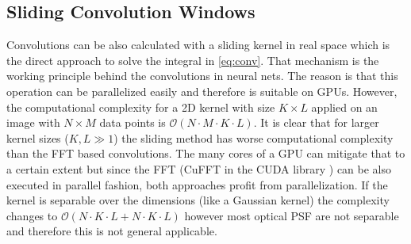 \documentclass{juliacon}
\begin{document}
\subsection{Sliding Convolution Windows}
Convolutions can be also calculated with a sliding kernel in real space which is the direct approach to
solve the integral in \autoref{eq:conv}.
That mechanism is the working principle
behind the convolutions in neural nets. The reason is that this operation can be parallelized easily and therefore 
is suitable on GPUs. However, the computational complexity for a 2D kernel with size $K \times L$ applied on an image with
$N \times M$ data points is $\mathcal O(N \cdot M \cdot K \cdot L)$. It is clear that for larger kernel sizes ($K,L \gg 1$) the sliding method 
has worse computational complexity than the FFT based convolutions. The many cores of a GPU can mitigate that to a certain extent
but since the FFT (CuFFT in the CUDA library \cite{CUDA}) can be also executed in parallel fashion, both approaches profit from parallelization.
If the kernel is separable over the dimensions (like a Gaussian kernel) the complexity changes to $\mathcal O(N \cdot K \cdot L +  N \cdot K \cdot L)$ however most optical PSF are not separable and therefore this is not general applicable. 
\end{document}
